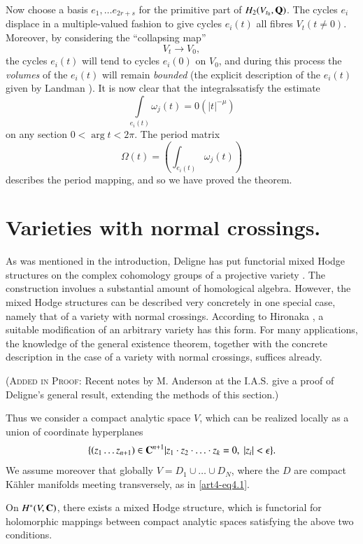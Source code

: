 Now choose a basis $e_1, \ldots e_{2r+s}$ for the primitive part of $H_2 (V_{t_0}, \mathbf{Q})$. The cycles $e_i$ displace in a multiple-valued fashion to give cycles $e_i(t)$ all fibres $V_t (t \neq 0)$. Moreover, by considering the ``collapsing map''
$$
V_t \to V_0,
$$
the cycles $e_i (t)$ will tend to cycles $e_i (0)$ on $V_0$, and during this process the \textit{volumes} of the $e_i(t)$ will remain \textit{bounded} (\cf the explicit description of the $e_i(t)$ given by Landman \cite{art4-key35}). It is now clear that the integrals\pageoriginale satisfy the estimate
$$
\int\limits_{e_i (t)} \omega_j (t) = 0 (|t|^{-\mu})
$$
on any section $0 < \arg t < 2\pi$. The period matrix
$$
\Omega (t) = \left(\int_{e_i (t)} \omega_j (t) \right)
$$
describes the period mapping, and so we have proved the theorem.

\section{Varieties with normal crossings.}\label{art4-sec4}
As was mentioned in the introduction, Deligne has put functorial mixed Hodge structures on the complex cohomology groups of a projective variety \cite{art4-key14}. The construction involues a substantial amount of homological algebra. However, the mixed Hodge structures can be described very concretely in one special case, namely that of a variety with normal crossings. According to Hironaka \cite{art4-key29}, a suitable modification of an arbitrary variety has this form. For many applications, the knowledge of the general existence theorem, together with the concrete description in the case of a variety with normal crossings, suffices already.

(\textsc{Added in Proof}: Recent notes by M. Anderson at the I.A.S. give a proof of Deligne's general result, extending the methods of this section.)

Thus we consider a compact analytic space  $V$, which can be realized locally as a union of coordinate hyperplanes
\setcounter{equation}{0}
\begin{equation}
\{(z_1 \ldots z_{n+1}) \in \mathbf{C}^{n+1} | z_1 \cdot z_2 \cdot \ldots \cdot z_k = 0,  \; |z_i| < \epsilon \}. 
\label{art4-eq4.1}
\end{equation}
We assume moreover that globally $V = D_1 \cup \ldots \cup D_N$, where the $D$ are compact K\"ahler manifolds meeting transversely, as in \eqref{art4-eq4.1}.

\begin{proposition}\label{art4-prop4.2}
On $H^\ast (V, \mathbf{C})$, there exists a mixed Hodge structure, which is functorial for holomorphic mappings between compact analytic spaces satisfying the above two conditions.
\end{proposition}

